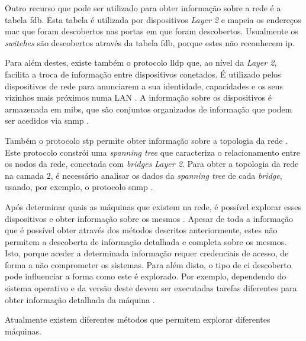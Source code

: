 \documentclass[
  oneside,
  11pt, a4paper,
  footinclude=true,
  headinclude=true,
  cleardoublepage=empty
]{scrbook}
\begin{document}
Outro recurso que pode ser utilizado para obter informação sobre a rede é a tabela \gls{fdb}. Esta tabela é utilizada por dispositivos \textit{Layer 2} \cite{bearden2013network} e mapeia os endereços \gls{mac} que foram descobertos nas portas em que foram descobertos. Usualmente os \textit{switches} são descobertos através da tabela \gls{fdb}, porque estes não reconhecem \gls{ip}. 

Para além destes, existe também o protocolo \gls{lldp} que, ao nível da \textit{Layer 2}, facilita a troca de informação entre dispositivos conetados. É utilizado pelos dispositivos de rede para anunciarem a sua identidade, capacidades e os seus vizinhos mais próximos numa LAN \cite{das2017link}. A informação sobre os dispositivos é armazenada em \glspl{mib}, que são conjuntos organizados de informação que podem ser acedidos via \gls{snmp} \cite{8934069}.

Também o protocolo \gls{stp} permite obter informação sobre a topologia da rede \citep{tabbara2014method}. Este protocolo constrói uma \textit{spanning tree} que caracteriza o relacionamento entre os nodos da rede, conectada com \textit{bridges Layer 2}. Para obter a topologia da rede na camada 2, é necessário analisar os dados da \textit{spanning tree} de cada \textit{bridge}, usando, por exemplo, o protocolo \gls{snmp} \cite{bearden2013network}.

Após determinar quais as máquinas que existem na rede, é possível explorar esses dispositivos e obter informação sobre os mesmos \citep{singer2004system}. Apesar de toda a informação que é possível obter através dos métodos descritos anteriormente, estes não permitem a descoberta de informação detalhada e completa sobre os mesmos. Isto, porque aceder a determinada informação requer credenciais de acesso, de forma a não comprometer os sistemas. Para além disto, o tipo de \gls{ci} descoberto pode influenciar a forma como este é explorado. Por exemplo, dependendo do sistema operativo e da versão deste devem ser executadas tarefas diferentes para obter informação detalhada da máquina \cite{taddm}.

Atualmente existem diferentes métodos que permitem explorar diferentes máquinas. 
\end{document}
